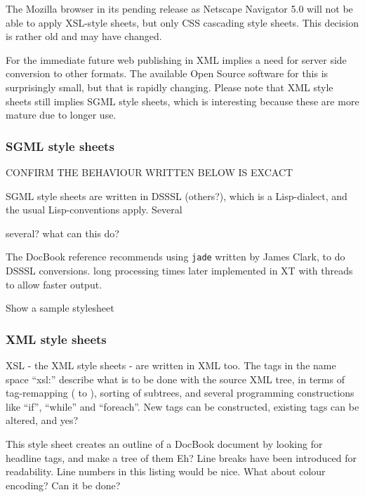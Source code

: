 The Mozilla browser in its pending release as Netscape Navigator 5.0
will not be able to apply XSL-style sheets, but only CSS cascading
style sheets.  This \textsf{decision is rather old and may have
  changed}. 

For the immediate future web publishing in XML implies a need for
server side conversion to other formats.  The available Open Source
software for this is surprisingly small, but that is rapidly
changing.  Please note that XML style sheets still implies SGML style
sheets, which is interesting because these are more mature due to
longer use.


\subsubsection{SGML style sheets}

\textsf{CONFIRM THE BEHAVIOUR WRITTEN BELOW IS EXCACT}

SGML style sheets are \textsf{written in DSSSL} (others?), which is
a Lisp-dialect, and the usual Lisp-conventions apply.  Several

\textsf{several?} \textsf{what can this do?}

The DocBook reference recommends using \texttt{jade} written by James
Clark, to do DSSSL conversions.  \textsf{long processing times later
  implemented in XT with threads to allow faster output}.  

\textsf{Show a sample stylesheet}

\subsubsection{XML style sheets}

XSL - the XML style sheets - are written in XML too.  The tags in the
name space ``xsl:'' describe what is to be done with the source XML
tree, in terms of tag-remapping ( to ), sorting
of subtrees, and several programming constructions like ``if'',
``while'' and ``foreach''.  New tags can be constructed, existing tags
can be altered, and \textsf{yes?}

This style sheet creates an outline of a DocBook document by looking
for headline tags, and make a tree of them \textsf{Eh? }  Line breaks
have been introduced for readability.  \textsf{Line numbers in this
  listing  would be nice.  What about colour encoding?  Can it be done?}

{\small

}






